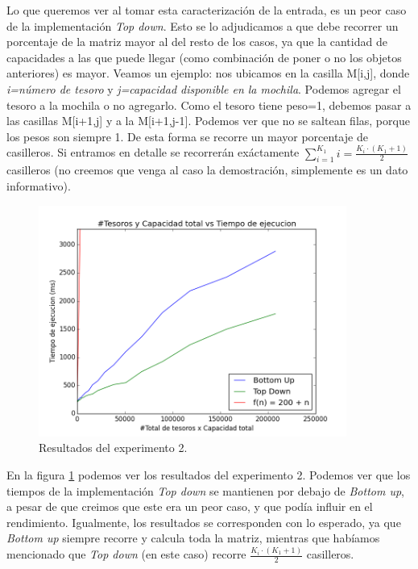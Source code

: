\par Lo que queremos ver al tomar esta caracterización de la entrada, es un peor caso de la implementación \textit{Top down}. Esto se lo adjudicamos a que debe recorrer un porcentaje de la matriz mayor al del resto de los casos, ya que la cantidad de capacidades a las que puede llegar (como combinación de poner o no los objetos anteriores) es mayor. Veamos un ejemplo: nos ubicamos en la casilla M[i,j], donde \textit{i=número de tesoro} y \textit{j=capacidad disponible en la mochila}. Podemos agregar el tesoro a la mochila o no agregarlo. Como el tesoro tiene peso=1, debemos pasar a las casillas M[i+1,j] y a la M[i+1,j-1]. Podemos ver que no se saltean filas, porque los pesos son siempre 1. De esta forma se recorre un mayor porcentaje de casilleros. Si entramos en detalle se recorrerán exáctamente $\sum_{i=1}^{K_1}i = \frac{K_i \cdot (K_1 + 1)}{2}$ casilleros (no creemos que venga al caso la demostración, simplemente es un dato informativo).

\begin{figure}[H]
	\centering
	\includegraphics[width=0.9\textwidth]{Problema3/img/exp2_tiempos_peor.png}
	\caption{Resultados del experimento 2.}
	\label{fig: exp2_tiempos_peor}
\end{figure}

\par En la figura \ref{fig: exp2_tiempos_peor} podemos ver los resultados del experimento 2. Podemos ver que los tiempos de la implementación \textit{Top down} se mantienen por debajo de \textit{Bottom up}, a pesar de que creimos que este era un peor caso, y que podía influir en el rendimiento. Igualmente, los resultados se corresponden con lo esperado, ya que \textit{Bottom up} siempre recorre y calcula toda la matriz, mientras que habíamos mencionado que \textit{Top down} (en este caso) recorre $\frac{K_i \cdot (K_1 + 1)}{2}$ casilleros.

